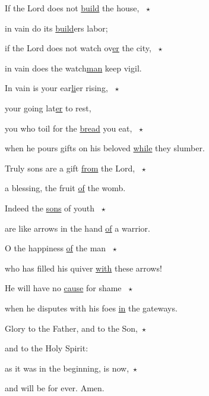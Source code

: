 \noindent If the Lord does not \uline{build} the house, ~$\star$~\nopagebreak

in vain do its \uline{build}ers labor;

\noindent if the Lord does not watch ov\uline{er} the city, ~$\star$~\nopagebreak

in vain does the watch\uline{man} keep vigil.

\noindent In vain is your ear\uline{li}er rising, ~$\star$~\nopagebreak

your going lat\uline{er} to rest,

\noindent you who toil for the \uline{bread} you eat, ~$\star$~\nopagebreak

when he pours gifts on his beloved \uline{while} they slumber.

\noindent Truly sons are a gift \uline{from} the Lord, ~$\star$~\nopagebreak

a blessing, the fruit \uline{of} the womb.

\noindent Indeed the \uline{sons} of youth ~$\star$~\nopagebreak

are like arrows in the hand \uline{of} a warrior.

\noindent O the happiness \uline{of} the man ~$\star$~\nopagebreak

who has filled his quiver \uline{with} these arrows!

\noindent He will have no \uline{cause} for shame ~$\star$~\nopagebreak

when he disputes with his foes \uline{in} the gateways.

\noindent Glory to the Father, and to the Son,~$\star$~\nopagebreak

and to the Holy Spirit:

\noindent as it was in the beginning, is now,~$\star$~\nopagebreak

and will be for ever. Amen.
